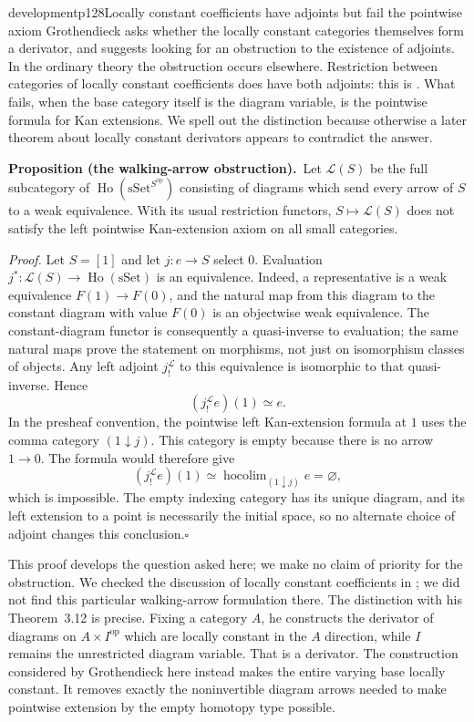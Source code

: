 \begin{dcomment}{development}{p128}{Locally constant coefficients have adjoints but fail the pointwise axiom}
Grothendieck asks whether the locally constant categories themselves form a derivator, and suggests looking for an obstruction to the existence of adjoints. In the ordinary theory the obstruction occurs elsewhere. Restriction between categories of locally constant coefficients does have both adjoints: this is \citet[Corollary~3.10]{Cisinski2009LocallyConstant}. What fails, when the base category itself is the diagram variable, is the pointwise formula for Kan extensions. We spell out the distinction because otherwise a later theorem about locally constant derivators appears to contradict the answer.

\textbf{Proposition (the walking-arrow obstruction).}\ours\
Let $\mathcal L(S)$ be the full subcategory of $\operatorname{Ho}(\mathrm{sSet}^{S^{\mathrm{op}}})$ consisting of diagrams which send every arrow of $S$ to a weak equivalence. With its usual restriction functors, $S\mapsto\mathcal L(S)$ does not satisfy the left pointwise Kan-extension axiom on all small categories.

\textit{Proof.} Let $S=[1]$ and let $j:e\to S$ select $0$. Evaluation $j^*:\mathcal L(S)\to\operatorname{Ho}(\mathrm{sSet})$ is an equivalence. Indeed, a representative is a weak equivalence $F(1)\to F(0)$, and the natural map from this diagram to the constant diagram with value $F(0)$ is an objectwise weak equivalence. The constant-diagram functor is consequently a quasi-inverse to evaluation; the same natural maps prove the statement on morphisms, not just on isomorphism classes of objects. Any left adjoint $j_!^{\mathcal L}$ to this equivalence is isomorphic to that quasi-inverse. Hence
\[
 (j_!^{\mathcal L}e)(1)\simeq e.
\]
In the presheaf convention, the pointwise left Kan-extension formula at $1$ uses the comma category $(1\downarrow j)$. This category is empty because there is no arrow $1\to0$. The formula would therefore give
\[
 (j_!^{\mathcal L}e)(1)\simeq
 \operatorname{hocolim}_{(1\downarrow j)} e=\varnothing,
\]
which is impossible. The empty indexing category has its unique diagram, and its left extension to a point is necessarily the initial space, so no alternate choice of adjoint changes this conclusion.\hfill$\square$

This proof develops the question asked here; we make no claim of priority for the obstruction. We checked the discussion of locally constant coefficients in \citet[Sections~1--3]{Cisinski2009LocallyConstant}; we did not find this particular walking-arrow formulation there. The distinction with his Theorem~3.12 is precise. Fixing a category $A$, he constructs the derivator of diagrams on $A\times I^{\mathrm{op}}$ which are locally constant in the $A$ direction, while $I$ remains the unrestricted diagram variable. That is a derivator. The construction considered by Grothendieck here instead makes the entire varying base locally constant. It removes exactly the noninvertible diagram arrows needed to make pointwise extension by the empty homotopy type possible.


\end{dcomment}

